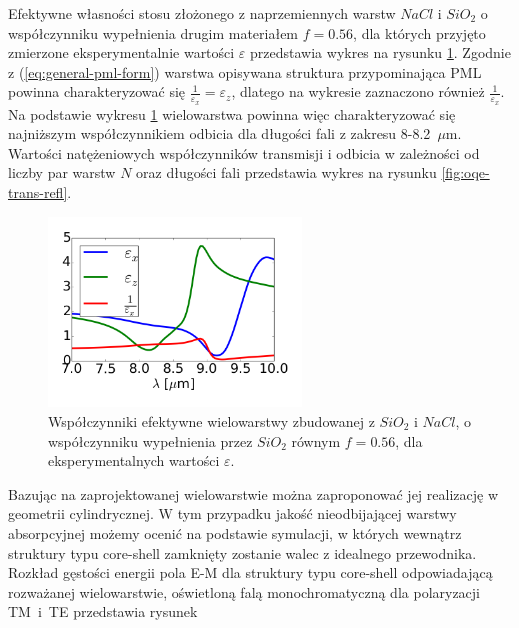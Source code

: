 Efektywne własności stosu złożonego z naprzemiennych warstw $NaCl$ i $SiO_2$ o współczynniku wypełnienia drugim materiałem $f=0.56$, dla których przyjęto zmierzone eksperymentalnie wartości $\varepsilon$ przedstawia wykres na rysunku \ref{fig:eff-pml-real}. Zgodnie z (\ref{eq:general-pml-form}) warstwa opisywana struktura przypominająca PML powinna charakteryzować się $\frac{1}{\varepsilon_x}=\varepsilon_z$, dlatego na wykresie zaznaczono również $\frac{1}{\varepsilon_x}$. Na podstawie wykresu \ref{fig:eff-pml-real} wielowarstwa powinna więc charakteryzować się najniższym współczynnikiem odbicia dla długości fali z zakresu 8-8.2~$\mu$m. Wartości natężeniowych współczynników transmisji i odbicia w zależności od liczby par warstw $N$ oraz długości fali przedstawia wykres na rysunku \ref{fig:oqe-trans-refl}.

\begin{figure}
	\includegraphics[width=0.6\textwidth]{images/pml/effepsilon-nacl-sio2.png}
	\caption{Współczynniki efektywne wielowarstwy zbudowanej z $SiO_2$ i $NaCl$, o współczynniku wypełnienia przez $SiO_2$ równym $f=0.56$, dla eksperymentalnych wartości $\varepsilon$.}
	\label{fig:eff-pml-real}
\end{figure}

Bazując na zaprojektowanej wielowarstwie można zaproponować jej realizację w geometrii cylindrycznej. W tym przypadku jakość nieodbijającej warstwy absorpcyjnej możemy ocenić na podstawie symulacji, w których wewnątrz struktury typu core-shell zamknięty zostanie walec z idealnego przewodnika. Rozkład gęstości energii pola E-M dla struktury typu core-shell odpowiadającą rozważanej wielowarstwie, oświetloną falą monochromatyczną dla polaryzacji TM~i~TE przedstawia rysunek 

